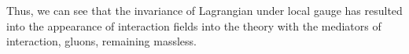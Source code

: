 Thus, we can see that the invariance of Lagrangian under local gauge has resulted into the appearance of interaction fields into the theory with the mediators
of interaction, gluons, remaining massless.


